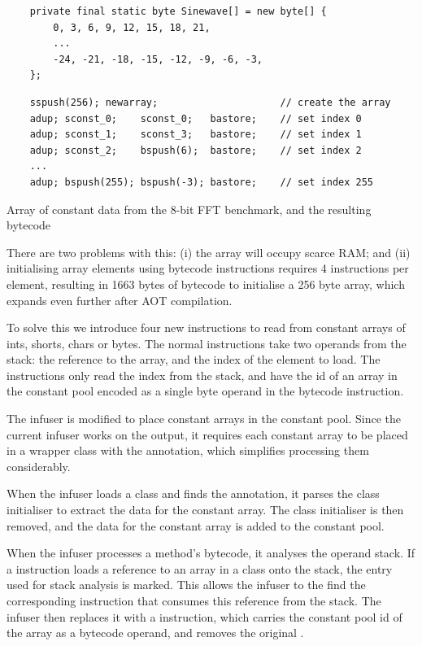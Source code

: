 \begin{listing}
\begin{verbatim}
    private final static byte Sinewave[] = new byte[] {
        0, 3, 6, 9, 12, 15, 18, 21,
        ...
        -24, -21, -18, -15, -12, -9, -6, -3, 
    };
\end{verbatim}
\begin{verbatim}
    sspush(256); newarray;                     // create the array
    adup; sconst_0;    sconst_0;   bastore;    // set index 0
    adup; sconst_1;    sconst_3;   bastore;    // set index 1
    adup; sconst_2;    bspush(6);  bastore;    // set index 2
    ...
    adup; bspush(255); bspush(-3); bastore;    // set index 255
\end{verbatim}
\caption{Array of constant data from the 8-bit FFT benchmark, and the resulting bytecode}
\label{lst-constant-array-initialisation}
\end{listing}


There are two problems with this: (i) the array will occupy scarce RAM; and (ii) initialising array elements using bytecode instructions requires 4 instructions per element, resulting in 1663 bytes of bytecode to initialise a 256 byte array, which expands even further after AOT compilation.

To solve this we introduce four new  instructions to read from constant arrays of ints, shorts, chars or bytes. The normal  instructions take two operands from the stack: the reference to the array, and the index of the element to load. The  instructions only read the index from the stack, and have the id of an array in the constant pool encoded as a single byte operand in the bytecode instruction.

The infuser is modified to place constant arrays in the constant pool. Since the current infuser works on the  output, it requires each constant array to be placed in a wrapper class with the  annotation, which simplifies processing them considerably.

When the infuser loads a class and finds the  annotation, it parses the  class initialiser to extract the data for the constant array. The class initialiser is then removed, and the data for the constant array is added to the constant pool.

When the infuser processes a method's bytecode, it analyses the operand stack. If a  instruction loads a reference to an array in a  class onto the stack, the entry used for stack analysis is marked. This allows the infuser to the find the corresponding  instruction that consumes this reference from the stack. The infuser then replaces it with a  instruction, which carries the constant pool id of the array as a bytecode operand, and removes the original .

